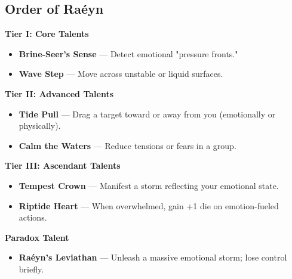 \documentclass[11pt]{book}
\begin{document}
\subsection*{Order of Raéyn}
\begin{tcolorbox}[colback=mistgray!10,colframe=shadowviolet,title={Order of Raéyn --- Talents}]

\textbf{Tier I: Core Talents}
\begin{itemize}[noitemsep]
  \item \textbf{Brine-Seer's Sense} --- Detect emotional "pressure fronts."
  \item \textbf{Wave Step} --- Move across unstable or liquid surfaces.
\end{itemize}

\textbf{Tier II: Advanced Talents}
\begin{itemize}[noitemsep]
  \item \textbf{Tide Pull} --- Drag a target toward or away from you (emotionally or physically).
  \item \textbf{Calm the Waters} --- Reduce tensions or fears in a group.
\end{itemize}

\textbf{Tier III: Ascendant Talents}
\begin{itemize}[noitemsep]
  \item \textbf{Tempest Crown} --- Manifest a storm reflecting your emotional state.
  \item \textbf{Riptide Heart} --- When overwhelmed, gain +1 die on emotion-fueled actions.
\end{itemize}

\textbf{Paradox Talent}
\begin{itemize}[noitemsep]
  \item \textbf{Raéyn's Leviathan} --- Unleash a massive emotional storm; lose control briefly.
\end{itemize}

\end{tcolorbox}

\end{document}
